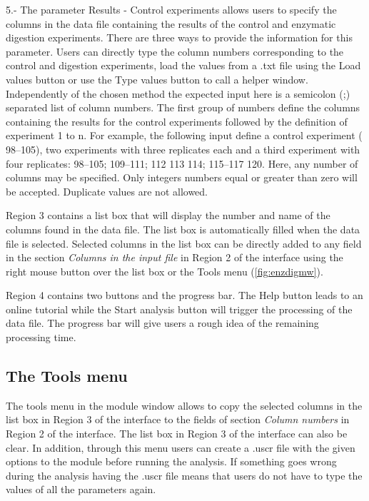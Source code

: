 \num{5}.- \label{par:results}The parameter Results - Control experiments allows users to specify the columns in the data file containing the results of the control and enzymatic digestion experiments. There are three ways to provide the information for this parameter. Users can directly type the column numbers corresponding to the control and digestion experiments, load the  values from a .txt file using the Load values button or use the Type values button to call a helper window. Independently of the chosen method the expected input here is a semicolon (;) separated list of column numbers. The first group of numbers define the columns containing the results for the control experiments followed by the definition of experiment \num{1} to n. For example, the following input define a control experiment ( \numrange[range-phrase = --]{98}{105}), two experiments with three replicates each and a third experiment with four replicates: \numrange[range-phrase = --]{98}{105}; \numrange[range-phrase = --]{109}{111}; 112 113 114; \numrange[range-phrase = --]{115}{117} 120. Here, any number of columns may be specified. Only integers numbers equal or greater than zero will be accepted. Duplicate values are not allowed.

Region \num{3} contains a list box that will display the number and name of the columns found in the data file. The list box is automatically filled when the data file is selected. Selected columns in the list box can be directly added to any field in the section \textit{Columns in the input file} in Region \num{2} of the interface using the right mouse button over the list box or the Tools menu (\autoref{fig:enzdigmw}).

Region \num{4} contains two buttons and the progress bar. The Help button leads to an online tutorial while the Start analysis button will trigger the processing of the data file. The progress bar will give users a rough idea of the remaining processing time.

\subsection{The Tools menu}

The tools menu in the module window allows to copy the selected columns in the list box in Region \num{3} of the interface to the fields of section \textit{Column numbers} in Region \num{2} of the interface. The list box in Region \num{3} of the interface can also be clear. In addition, through this menu users can create a .uscr file with the given options to the module before running the analysis. If something goes wrong during the analysis having the .uscr file means that users do not have to type the values of all the parameters again.   

